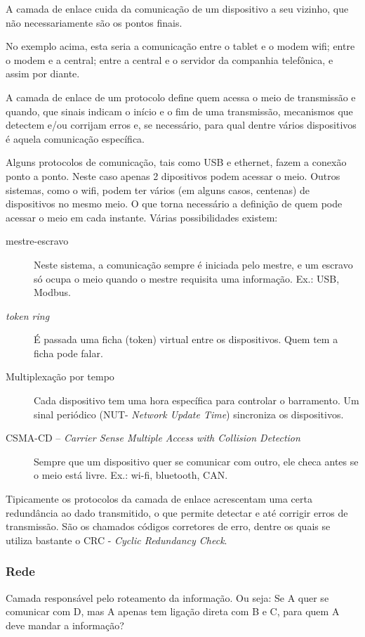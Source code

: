 A camada de enlace cuida da comunicação de um dispositivo a seu vizinho, que não necessariamente são os pontos finais.

No exemplo acima, esta seria a comunicação entre o tablet e o modem wifi; entre o modem e a central; entre a central e o servidor da companhia telefônica, e assim por diante.

A camada de enlace de um protocolo define quem acessa o meio de transmissão e quando, que sinais indicam o início e o fim de uma transmissão, mecanismos que detectem e/ou corrijam erros e, se necessário, para qual dentre vários dispositivos é aquela comunicação específica.

Alguns protocolos de comunicação, tais como USB e ethernet, fazem a conexão ponto a ponto. Neste caso apenas 2 dipositivos podem acessar o meio. Outros sistemas, como o wifi, podem ter vários (em alguns casos, centenas) de dispositivos no mesmo meio. O que torna necessário a definição de quem pode acessar o meio em cada instante. Várias possibilidades existem:
\begin{description}
	\item[mestre-escravo] Neste sistema, a comunicação sempre é iniciada pelo mestre, e um escravo só ocupa o meio quando o mestre requisita uma informação. Ex.: USB, Modbus.
	\item[\emph{token ring}] É passada uma ficha (token) virtual entre os dispositivos. Quem tem a ficha pode falar.
	\item[Multiplexação por tempo] Cada dispositivo tem uma hora específica para controlar o barramento. Um sinal periódico (NUT- \emph{Network Update Time}) sincroniza os dispositivos.
	\item[CSMA-CD -- \emph{Carrier Sense Multiple Access with Collision Detection}] Sempre que um dispositivo quer se comunicar com outro, ele checa antes se o meio está livre. Ex.: wi-fi, bluetooth, CAN.
\end{description}

Tipicamente os protocolos da camada de enlace acrescentam uma certa redundância ao dado transmitido, o que permite detectar e até corrigir erros de transmissão. São os chamados códigos corretores de erro, dentre os quais se utiliza bastante o CRC - \emph{Cyclic Redundancy Check}.

\subsubsection{Rede}
Camada responsável pelo roteamento da informação. Ou seja: Se A quer se comunicar com D, mas A apenas tem ligação direta com B e C, para quem A deve mandar a informação?

